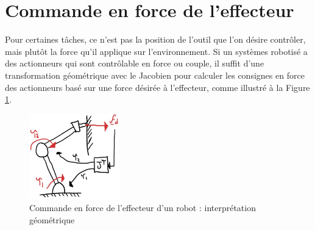 

\newpage
\section{Commande en force de l'effecteur}
\label{sec:forcecontrol}

Pour certaines tâches, ce n'est pas la position de l'outil que l'on désire contrôler, mais plutôt la force qu'il applique sur l'environnement. Si un systèmes robotisé a des actionneurs qui sont contrôlable en force ou couple, il suffit d'une transformation géométrique avec le Jacobien pour calculer les consignes en force des actionneurs basé sur une force désirée à l'effecteur, comme illustré à la Figure \ref{fig:forcecontroleffectorgeo}. 
\begin{figure}[H]
	\centering
		\includegraphics[width=0.35\textwidth]{fig/forcecontroleffectorgeo.jpg}
	\caption{Commande en force de l'effecteur d'un robot : interprétation géométrique}
	\label{fig:forcecontroleffectorgeo}
\end{figure}


